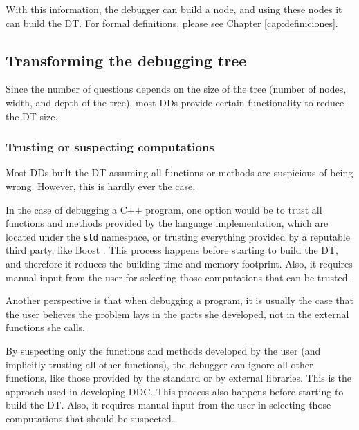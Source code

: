 With this information, the debugger can build a node, and using these nodes it can build the DT.
%
For formal definitions, please see Chapter \ref{cap:definiciones}.

\subsection{Transforming the debugging tree}

Since the number of questions depends on the size of the tree (number of nodes, width, and depth of the tree), most DDs provide certain functionality to reduce the DT size.

\subsubsection{Trusting or suspecting computations}

Most DDs built the DT assuming all functions or methods are suspicious of being wrong.
However, this is hardly ever the case.

In the case of debugging a C++ program, one option would be to trust all functions and methods provided by the language implementation, which are located under the \verb|std| namespace, or trusting everything provided by a reputable third party, like Boost \cite{TheBoostLibraries}.
This process happens before starting to build the DT, and therefore it reduces the building time and memory footprint. Also, it requires manual input from the user for selecting those computations that can be trusted.

Another perspective is that when debugging a program, it is usually the case that the user believes the problem lays in the parts she developed, not in the external functions she calls.

By suspecting only the functions and methods developed by the user (and implicitly trusting all other functions), the debugger can ignore all other functions, like those provided by the standard or by external libraries.
This is the approach used in developing DDC.
This process also happens before starting to build the DT. Also, it requires manual input from the user in selecting those computations that should be suspected.

